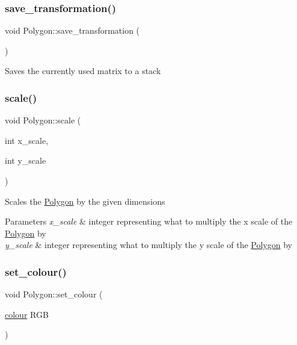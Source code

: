 \subsubsection{\texorpdfstring{save\+\_\+transformation()}{save\_transformation()}}
{\footnotesize\ttfamily void Polygon\+::save\+\_\+transformation (\begin{DoxyParamCaption}{ }\end{DoxyParamCaption})}

Saves the currently used matrix to a stack \mbox{\label{class_polygon_a3166ec344b0453bde49f6c32300eab12}} 
\subsubsection{\texorpdfstring{scale()}{scale()}}
{\footnotesize\ttfamily void Polygon\+::scale (\begin{DoxyParamCaption}\item[{int}]{x\+\_\+scale,  }\item[{int}]{y\+\_\+scale }\end{DoxyParamCaption})}

Scales the \mbox{\hyperlink{class_polygon}{Polygon}} by the given dimensions 
\begin{DoxyParams}{Parameters}
{\em x\+\_\+scale} & integer representing what to multiply the x scale of the \mbox{\hyperlink{class_polygon}{Polygon}} by \\
\hline
{\em y\+\_\+scale} & integer representing what to multiply the y scale of the \mbox{\hyperlink{class_polygon}{Polygon}} by \\
\hline
\end{DoxyParams}
\mbox{\label{class_polygon_a5895893a117ad4fba5422e9269ff729c}} 
\subsubsection{\texorpdfstring{set\+\_\+colour()}{set\_colour()}}
{\footnotesize\ttfamily void Polygon\+::set\+\_\+colour (\begin{DoxyParamCaption}\item[{\mbox{\hyperlink{structcolour}{colour}}}]{R\+GB }\end{DoxyParamCaption})}

